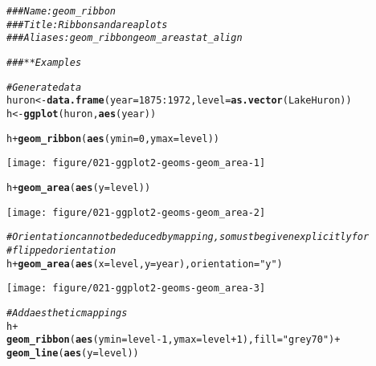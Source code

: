 \documentclass[a4paper,titlepage]{tufte-handout}\usepackage[]{graphicx}\usepackage[]{xcolor}
\makeatletter
\def\maxwidth{ %
  \ifdim\Gin@nat@width>\linewidth
    \linewidth
  \else
    \Gin@nat@width
  \fi
}
\newcommand{\hlnum}[1]{\textcolor[rgb]{0.686,0.059,0.569}{#1}}%
\newcommand{\hlsng}[1]{\textcolor[rgb]{0.192,0.494,0.8}{#1}}%
\newcommand{\hlcom}[1]{\textcolor[rgb]{0.678,0.584,0.686}{\textit{#1}}}%
\newcommand{\hlopt}[1]{\textcolor[rgb]{0,0,0}{#1}}%
\newcommand{\hldef}[1]{\textcolor[rgb]{0.345,0.345,0.345}{#1}}%
\newcommand{\hlkwb}[1]{\textcolor[rgb]{0.69,0.353,0.396}{#1}}%
\newcommand{\hlkwc}[1]{\textcolor[rgb]{0.333,0.667,0.333}{#1}}%
\newcommand{\hlkwd}[1]{\textcolor[rgb]{0.737,0.353,0.396}{\textbf{#1}}}%
\newenvironment{kframe}{%
 \def\at@end@of@kframe{}%
 \ifinner\ifhmode%
  \def\at@end@of@kframe{\end{minipage}}%
  \begin{minipage}{\columnwidth}%
 \fi\fi%
 \def\FrameCommand##1{\hskip\@totalleftmargin \hskip-\fboxsep
 \colorbox{shadecolor}{##1}\hskip-\fboxsep
     \hskip-\linewidth \hskip-\@totalleftmargin \hskip\columnwidth}%
 \MakeFramed {\advance\hsize-\width
   \@totalleftmargin\z@ \linewidth\hsize
   \@setminipage}}%
 {\par\unskip\endMakeFramed%
 \at@end@of@kframe}
\newenvironment{knitrout}{}{} %
\makeatother
\begin{document}
\begin{knitrout}
\color{fgcolor}\begin{kframe}
\begin{alltt}
\hlcom{### Name: geom_ribbon}
\hlcom{### Title: Ribbons and area plots}
\hlcom{### Aliases: geom_ribbon geom_area stat_align}

\hlcom{### ** Examples}

\hlcom{# Generate data}
\hldef{huron} \hlkwb{<-} \hlkwd{data.frame}\hldef{(}\hlkwc{year} \hldef{=} \hlnum{1875}\hlopt{:}\hlnum{1972}\hldef{,} \hlkwc{level} \hldef{=} \hlkwd{as.vector}\hldef{(LakeHuron))}
\hldef{h} \hlkwb{<-} \hlkwd{ggplot}\hldef{(huron,} \hlkwd{aes}\hldef{(year))}

\hldef{h} \hlopt{+} \hlkwd{geom_ribbon}\hldef{(}\hlkwd{aes}\hldef{(}\hlkwc{ymin}\hldef{=}\hlnum{0}\hldef{,} \hlkwc{ymax}\hldef{=level))}
\end{alltt}
\end{kframe}
\texttt{[image: figure/021-ggplot2-geoms-geom\_area-1]} 
\begin{kframe}\begin{alltt}
\hldef{h} \hlopt{+} \hlkwd{geom_area}\hldef{(}\hlkwd{aes}\hldef{(}\hlkwc{y} \hldef{= level))}
\end{alltt}
\end{kframe}
\texttt{[image: figure/021-ggplot2-geoms-geom\_area-2]} 
\begin{kframe}\begin{alltt}
\hlcom{# Orientation cannot be deduced by mapping, so must be given explicitly for}
\hlcom{# flipped orientation}
\hldef{h} \hlopt{+} \hlkwd{geom_area}\hldef{(}\hlkwd{aes}\hldef{(}\hlkwc{x} \hldef{= level,} \hlkwc{y} \hldef{= year),} \hlkwc{orientation} \hldef{=} \hlsng{"y"}\hldef{)}
\end{alltt}
\end{kframe}
\texttt{[image: figure/021-ggplot2-geoms-geom\_area-3]} 
\begin{kframe}\begin{alltt}
\hlcom{# Add aesthetic mappings}
\hldef{h} \hlopt{+}
  \hlkwd{geom_ribbon}\hldef{(}\hlkwd{aes}\hldef{(}\hlkwc{ymin} \hldef{= level} \hlopt{-} \hlnum{1}\hldef{,} \hlkwc{ymax} \hldef{= level} \hlopt{+} \hlnum{1}\hldef{),} \hlkwc{fill} \hldef{=} \hlsng{"grey70"}\hldef{)} \hlopt{+}
  \hlkwd{geom_line}\hldef{(}\hlkwd{aes}\hldef{(}\hlkwc{y} \hldef{= level))}
\end{alltt}
\end{kframe}

\end{knitrout}
\end{document}
